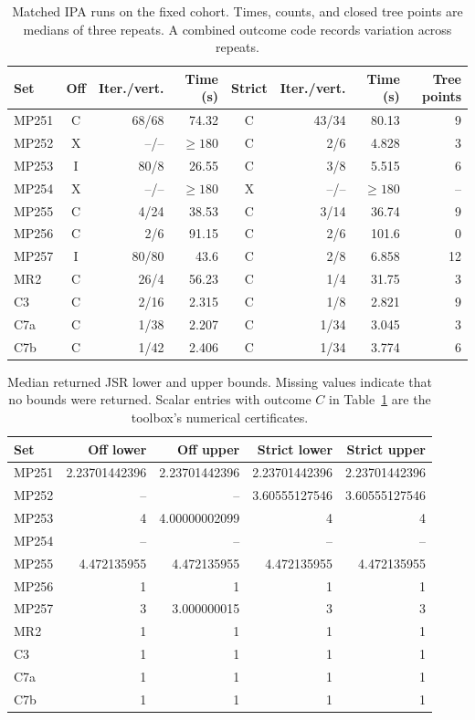 \begin{table}[H]
\centering\small
\begin{tabular}{@{}lcrrcrrr@{}}
\toprule
Set & Off & Iter./vert. & Time (s) & Strict & Iter./vert. & Time (s) & Tree points \\
\midrule
MP251 & C & 68/68 & 74.32 & C & 43/34 & 80.13 & 9 \\
MP252 & X & --/-- & $\geq180$ & C & 2/6 & 4.828 & 3 \\
MP253 & I & 80/8 & 26.55 & C & 3/8 & 5.515 & 6 \\
MP254 & X & --/-- & $\geq180$ & X & --/-- & $\geq180$ & -- \\
MP255 & C & 4/24 & 38.53 & C & 3/14 & 36.74 & 9 \\
MP256 & C & 2/6 & 91.15 & C & 2/6 & 101.6 & 0 \\
MP257 & I & 80/80 & 43.6 & C & 2/8 & 6.858 & 12 \\
MR2 & C & 26/4 & 56.23 & C & 1/4 & 31.75 & 3 \\
C3 & C & 2/16 & 2.315 & C & 1/8 & 2.821 & 9 \\
C7a & C & 1/38 & 2.207 & C & 1/34 & 3.045 & 3 \\
C7b & C & 1/42 & 2.406 & C & 1/34 & 3.774 & 6 \\
\bottomrule
\end{tabular}
\caption{Matched IPA runs on the fixed cohort. Times, counts, and closed tree points are medians of three repeats. A combined outcome code records variation across repeats.}
\label{tab:ipaComparison}
\end{table}
\begin{table}[H]
\centering\small
\begin{tabular}{@{}lrrrr@{}}
\toprule
Set & Off lower & Off upper & Strict lower & Strict upper \\
\midrule
MP251 & 2.23701442396 & 2.23701442396 & 2.23701442396 & 2.23701442396 \\
MP252 & -- & -- & 3.60555127546 & 3.60555127546 \\
MP253 & 4 & 4.00000002099 & 4 & 4 \\
MP254 & -- & -- & -- & -- \\
MP255 & 4.472135955 & 4.472135955 & 4.472135955 & 4.472135955 \\
MP256 & 1 & 1 & 1 & 1 \\
MP257 & 3 & 3.000000015 & 3 & 3 \\
MR2 & 1 & 1 & 1 & 1 \\
C3 & 1 & 1 & 1 & 1 \\
C7a & 1 & 1 & 1 & 1 \\
C7b & 1 & 1 & 1 & 1 \\
\bottomrule
\end{tabular}
\caption{Median returned JSR lower and upper bounds. Missing values indicate that no bounds were returned. Scalar entries with outcome $C$ in Table~\ref{tab:ipaComparison} are the toolbox's numerical certificates.}
\label{tab:ipaBounds}
\end{table}
